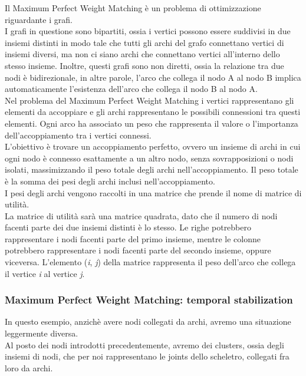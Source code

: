  Il Maximum Perfect Weight Matching è un problema di ottimizzazione riguardante i grafi. \\
 I grafi in questione sono bipartiti, ossia i vertici possono essere suddivisi in due insiemi distinti in
modo tale che tutti gli archi del grafo connettano vertici di insiemi diversi, ma non ci siano archi che connettano vertici all’interno dello stesso insieme.
Inoltre, questi grafi sono non diretti, ossia la relazione tra due nodi è bidirezionale, in altre parole, l'arco che collega il nodo A al nodo B implica automaticamente l'esistenza dell'arco che collega il nodo B al nodo A. \\
Nel problema del Maximum Perfect Weight Matching i vertici rappresentano gli elementi da accoppiare e gli archi rappresentano le possibili connessioni tra questi elementi. Ogni arco ha associato un peso che rappresenta il valore o l'importanza dell'accoppiamento tra i vertici connessi. \\
 L'obiettivo è trovare un accoppiamento perfetto, ovvero un insieme di archi in cui ogni nodo è connesso esattamente a un altro nodo, senza sovrapposizioni o nodi isolati, massimizzando il peso totale degli archi nell'accoppiamento.
 Il peso totale è la somma dei pesi degli archi inclusi nell'accoppiamento. \\
 I pesi degli archi vengono raccolti in una matrice che prende il nome di matrice di utilità. \\
 La matrice di utilità sarà una matrice quadrata, dato che il numero di nodi facenti parte dei due insiemi distinti è lo stesso.
Le righe potrebbero rappresentare i nodi facenti parte del primo insieme, mentre le colonne potrebbero rappresentare i nodi facenti parte del secondo insieme, oppure viceversa.
 L'elemento (\textit{i}, \textit{j}) della matrice rappresenta il peso dell'arco che collega il vertice \textit{i} al vertice \textit{j}.
 


\subsubsection{Maximum Perfect Weight Matching: temporal stabilization}
In questo esempio, anzichè avere nodi collegati da archi, avremo una situazione leggermente diversa. \\   
Al posto dei nodi introdotti precedentemente, avremo dei clusters, ossia degli insiemi di nodi, che per noi rappresentano le joints dello scheletro, collegati fra loro da archi.
\\  

